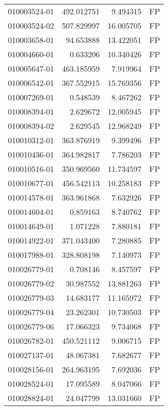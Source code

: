 \begin{tabular}{lrrl}
010003524-01 &  492.012751 &       9.494315 &   FP \\
010003524-02 &  507.829997 &      16.005705 &   FP \\
010003658-01 &   94.653888 &      13.422051 &   FP \\
010004660-01 &    0.633206 &      10.340426 &   FP \\
010005647-01 &  463.185959 &       7.919964 &   FP \\
010006542-01 &  367.552915 &      15.769356 &   FP \\
010007269-01 &    0.548539 &       8.467262 &   FP \\
010008394-01 &    2.629672 &      12.005945 &   FP \\
010008394-02 &    2.629545 &      12.968249 &   FP \\
010010312-01 &  363.876919 &       9.399496 &   FP \\
010010436-01 &  364.982817 &       7.786203 &   FP \\
010010516-01 &  350.969560 &      11.734597 &   FP \\
010010677-01 &  456.542113 &      10.258183 &   FP \\
010014578-01 &  363.961868 &       7.632926 &   FP \\
010014604-01 &    0.859163 &       8.740762 &   FP \\
010014649-01 &    1.071228 &       7.880181 &   FP \\
010014922-01 &  371.043400 &       7.280885 &   FP \\
010017988-01 &  328.808198 &       7.140973 &   FP \\
010026779-01 &    0.708146 &       8.457597 &   FP \\
010026779-02 &   30.987552 &      13.881263 &   FP \\
010026779-03 &   14.683177 &      11.165972 &   FP \\
010026779-04 &   23.262301 &      10.730503 &   FP \\
010026779-06 &   17.066323 &       9.734068 &   FP \\
010026782-01 &  450.521112 &       9.006715 &   FP \\
010027137-01 &   48.067381 &       7.682677 &   FP \\
010028156-01 &  264.963195 &       7.692036 &   FP \\
010028524-01 &   17.095589 &       8.047066 &   FP \\
010028824-01 &   24.047799 &      13.031660 &   FP \\

\end{tabular}
